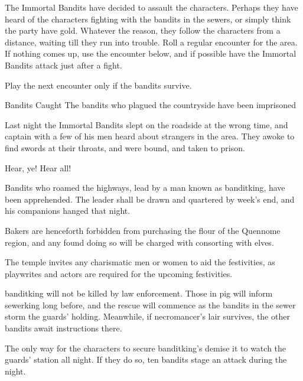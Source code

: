 \begin{multicols}{2}
The Immortal Bandits have decided to assault the characters.
Perhaps they have heard of the characters fighting with the bandits in the sewers, or simply think the party have gold.
Whatever the reason, they follow the characters from a distance, waiting till they run into trouble.
Roll a regular encounter for the area.
If nothing comes up, use the encounter below, and if possible have the Immortal Bandits attack just after a fight.


\banditking

Play the next encounter only if the bandits survive.

\resumecontents[Town]

{Bandits Caught}%
{The bandits who plagued the countryside have been imprisoned}%

\stopcontents[Town]

Last night the Immortal Bandits slept on the roadside at the wrong time, and \gls{captain} with a few of his men heard about strangers in the area.
They awoke to find swords at their throats, and were bound, and taken to prison.

\begin{boxtext}

	Hear, ye!  Hear all!

	Bandits who roamed the highways, lead by a man known as \gls{banditking}, have been apprehended.  The leader shall be drawn and quartered by week's end, and his companions hanged that night.

	Bakers are henceforth forbidden from purchasing the flour of the Quennome region, and any found doing so will be charged with consorting with elves.

	The temple invites any charismatic men or women to aid the festivities, as playwrites and actors are required for the upcoming festivities.

\end{boxtext}

\Gls{banditking} will not be killed by law enforcement.
Those in \gls{pig} will inform \gls{sewerking} long before, and the rescue will commence as the bandits in the sewer storm the guards' holding.
Meanwhile, if \gls{necromancer}'s lair survives, the other bandits await instructions there.

The only way for the characters to secure \gls{banditking}'s demise it to watch the guards' station all night.
If they do so, ten bandits stage an attack during the night.


\end{multicols}
